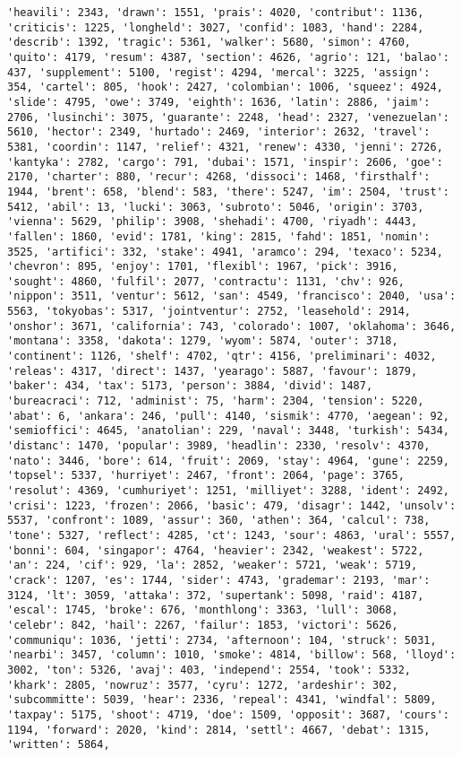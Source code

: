 \documentclass[11pt]{article}
\begin{document}
\begin{Verbatim}[commandchars=\\\{\}]
'heavili': 2343, 'drawn': 1551, 'prais': 4020, 'contribut': 1136, 'criticis': 1225, 'longheld': 3027, 'confid': 1083, 'hand': 2284, 'describ': 1392, 'tragic': 5361, 'walker': 5680, 'simon': 4760, 'quito': 4179, 'resum': 4387, 'section': 4626, 'agrio': 121, 'balao': 437, 'supplement': 5100, 'regist': 4294, 'mercal': 3225, 'assign': 354, 'cartel': 805, 'hook': 2427, 'colombian': 1006, 'squeez': 4924, 'slide': 4795, 'owe': 3749, 'eighth': 1636, 'latin': 2886, 'jaim': 2706, 'lusinchi': 3075, 'guarante': 2248, 'head': 2327, 'venezuelan': 5610, 'hector': 2349, 'hurtado': 2469, 'interior': 2632, 'travel': 5381, 'coordin': 1147, 'relief': 4321, 'renew': 4330, 'jenni': 2726, 'kantyka': 2782, 'cargo': 791, 'dubai': 1571, 'inspir': 2606, 'goe': 2170, 'charter': 880, 'recur': 4268, 'dissoci': 1468, 'firsthalf': 1944, 'brent': 658, 'blend': 583, 'there': 5247, 'im': 2504, 'trust': 5412, 'abil': 13, 'lucki': 3063, 'subroto': 5046, 'origin': 3703, 'vienna': 5629, 'philip': 3908, 'shehadi': 4700, 'riyadh': 4443, 'fallen': 1860, 'evid': 1781, 'king': 2815, 'fahd': 1851, 'nomin': 3525, 'artifici': 332, 'stake': 4941, 'aramco': 294, 'texaco': 5234, 'chevron': 895, 'enjoy': 1701, 'flexibl': 1967, 'pick': 3916, 'sought': 4860, 'fulfil': 2077, 'contractu': 1131, 'chv': 926, 'nippon': 3511, 'ventur': 5612, 'san': 4549, 'francisco': 2040, 'usa': 5563, 'tokyobas': 5317, 'jointventur': 2752, 'leasehold': 2914, 'onshor': 3671, 'california': 743, 'colorado': 1007, 'oklahoma': 3646, 'montana': 3358, 'dakota': 1279, 'wyom': 5874, 'outer': 3718, 'continent': 1126, 'shelf': 4702, 'qtr': 4156, 'preliminari': 4032, 'releas': 4317, 'direct': 1437, 'yearago': 5887, 'favour': 1879, 'baker': 434, 'tax': 5173, 'person': 3884, 'divid': 1487, 'bureacraci': 712, 'administ': 75, 'harm': 2304, 'tension': 5220, 'abat': 6, 'ankara': 246, 'pull': 4140, 'sismik': 4770, 'aegean': 92, 'semioffici': 4645, 'anatolian': 229, 'naval': 3448, 'turkish': 5434, 'distanc': 1470, 'popular': 3989, 'headlin': 2330, 'resolv': 4370, 'nato': 3446, 'bore': 614, 'fruit': 2069, 'stay': 4964, 'gune': 2259, 'topsel': 5337, 'hurriyet': 2467, 'front': 2064, 'page': 3765, 'resolut': 4369, 'cumhuriyet': 1251, 'milliyet': 3288, 'ident': 2492, 'crisi': 1223, 'frozen': 2066, 'basic': 479, 'disagr': 1442, 'unsolv': 5537, 'confront': 1089, 'assur': 360, 'athen': 364, 'calcul': 738, 'tone': 5327, 'reflect': 4285, 'ct': 1243, 'sour': 4863, 'ural': 5557, 'bonni': 604, 'singapor': 4764, 'heavier': 2342, 'weakest': 5722, 'an': 224, 'cif': 929, 'la': 2852, 'weaker': 5721, 'weak': 5719, 'crack': 1207, 'es': 1744, 'sider': 4743, 'grademar': 2193, 'mar': 3124, 'lt': 3059, 'attaka': 372, 'supertank': 5098, 'raid': 4187, 'escal': 1745, 'broke': 676, 'monthlong': 3363, 'lull': 3068, 'celebr': 842, 'hail': 2267, 'failur': 1853, 'victori': 5626, 'communiqu': 1036, 'jetti': 2734, 'afternoon': 104, 'struck': 5031, 'nearbi': 3457, 'column': 1010, 'smoke': 4814, 'billow': 568, 'lloyd': 3002, 'ton': 5326, 'avaj': 403, 'independ': 2554, 'took': 5332, 'khark': 2805, 'nowruz': 3577, 'cyru': 1272, 'ardeshir': 302, 'subcommitte': 5039, 'hear': 2336, 'repeal': 4341, 'windfal': 5809, 'taxpay': 5175, 'shoot': 4719, 'doe': 1509, 'opposit': 3687, 'cours': 1194, 'forward': 2020, 'kind': 2814, 'settl': 4667, 'debat': 1315, 'written': 5864, 
\end{Verbatim}
\end{document}
